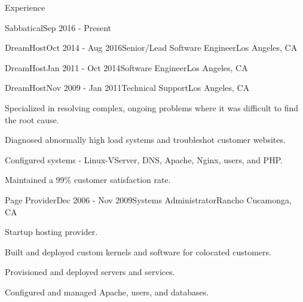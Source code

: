 \documentclass{resume} %
\begin{document}
\begin{rSection}{Experience}


\begin{rSubsection}{Sabbatical}{Sep 2016 - Present}{}{}
\end{rSubsection}


\begin{rSubsection}{DreamHost}{Oct 2014 - Aug 2016}{Senior/Lead Software Engineer}{Los Angeles, CA}
\end{rSubsection}


\begin{rSubsection}{DreamHost}{Jan 2011 - Oct 2014}{Software Engineer}{Los Angeles, CA}
\end{rSubsection}


\begin{rSubsection}{DreamHost}{Nov 2009 - Jan 2011}{Technical Support}{Los Angeles, CA}
\item Specialized in resolving complex, ongoing problems where it was difficult to find the root cause.
\item Diagnosed abnormally high load systems and troubleshot customer websites.
\item Configured systems - Linux-VServer, DNS, Apache, Nginx, users, and PHP.
\item Maintained a 99\% customer satisfaction rate.
\end{rSubsection}


\begin{rSubsection}{Page Provider}{Dec 2006 - Nov 2009}{Systems Administrator}{Rancho Cucamonga, CA}
\item Startup hosting provider.
\item Built and deployed custom kernels and software for colocated customers.
\item Provisioned and deployed servers and services.
\item Configured and managed Apache, users, and databases.
\end{rSubsection}

\end{rSection}

\end{document}
